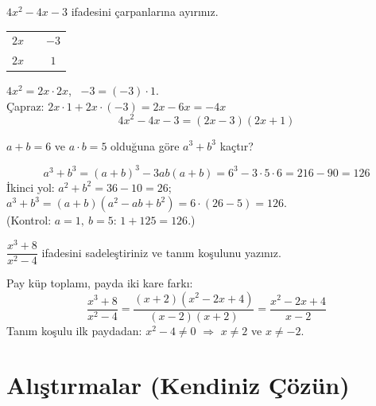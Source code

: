 \begin{alistirma}
\(4x^2-4x-3\) ifadesini çarpanlarına ayırınız.
\end{alistirma}
\begin{cozum}
\begin{minipage}[t]{0.2\linewidth}
\begin{tabular}{ccc}
\(2x\) & & \(-3\)\\
\(2x\) & & \(1\)
\end{tabular}
\end{minipage}\hfill
\begin{minipage}[t]{0.62\linewidth}
\(4x^2=2x\cdot 2x\), \ \(-3=(-3)\cdot 1\).\\
Çapraz: \(2x\cdot 1+2x\cdot(-3)=2x-6x=-4x\) \checkmark
\[4x^2-4x-3=(2x-3)(2x+1)\]
\end{minipage}
\end{cozum}

\begin{alistirma}
\(a+b=6\) ve \(a\cdot b=5\) olduğuna göre \(a^3+b^3\) kaçtır?
\end{alistirma}
\begin{cozum}
\[a^3+b^3=(a+b)^3-3ab(a+b)=6^3-3\cdot 5\cdot 6=216-90=126\]
İkinci yol: \(a^2+b^2=36-10=26\); \ \(a^3+b^3=(a+b)(a^2-ab+b^2)=6\cdot(26-5)=126\).\\
(Kontrol: \(a=1,\ b=5\): \(1+125=126\).)
\end{cozum}

\begin{alistirma}
\(\dfrac{x^3+8}{x^2-4}\) ifadesini sadeleştiriniz ve tanım koşulunu yazınız.
\end{alistirma}
\begin{cozum}
Pay küp toplamı, payda iki kare farkı:
\[\frac{x^3+8}{x^2-4}=\frac{(x+2)(x^2-2x+4)}{(x-2)(x+2)}=\frac{x^2-2x+4}{x-2}\]
Tanım koşulu ilk paydadan: \(x^2-4\neq 0\) \(\Rightarrow\) \(x\neq 2\) ve \(x\neq -2\).
\end{cozum}

\kendinizoncesi
\section{Alıştırmalar (Kendiniz Çözün)}

